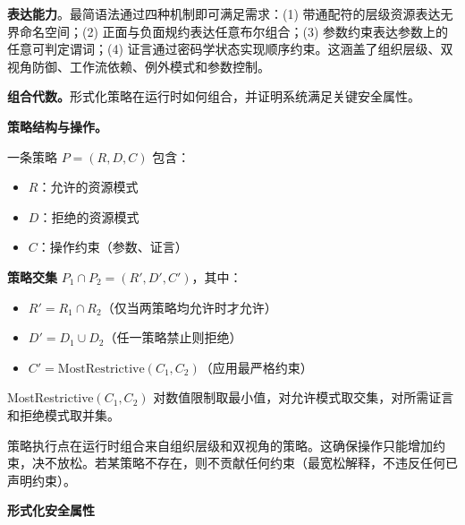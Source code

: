 \textbf{表达能力}。最简语法通过四种机制即可满足需求：(1) 带通配符的层级资源表达无界命名空间；(2) 正面与负面规约表达任意布尔组合；(3) 参数约束表达参数上的任意可判定谓词；(4) 证言通过密码学状态实现顺序约束。这涵盖了组织层级、双视角防御、工作流依赖、例外模式和参数控制。

\textbf{组合代数。}形式化策略在运行时如何组合，并证明系统满足关键安全属性。

\textbf{策略结构与操作。}

一条策略 $P = (R, D, C)$ 包含：
\begin{itemize}
\item $R$：允许的资源模式
\item $D$：拒绝的资源模式
\item $C$：操作约束（参数、证言）
\end{itemize}

\textbf{策略交集} $P_1 \cap P_2 = (R', D', C')$，其中：
\begin{itemize}
\item $R' = R_1 \cap R_2$（仅当两策略均允许时才允许）
\item $D' = D_1 \cup D_2$（任一策略禁止则拒绝）
\item $C' = \text{MostRestrictive}(C_1, C_2)$（应用最严格约束）
\end{itemize}

MostRestrictive$(C_1, C_2)$ 对数值限制取最小值，对允许模式取交集，对所需证言和拒绝模式取并集。

策略执行点在运行时组合来自组织层级和双视角的策略。这确保操作只能增加约束，决不放松。若某策略不存在，则不贡献任何约束（最宽松解释，不违反任何已声明约束）。

\textbf{形式化安全属性}

